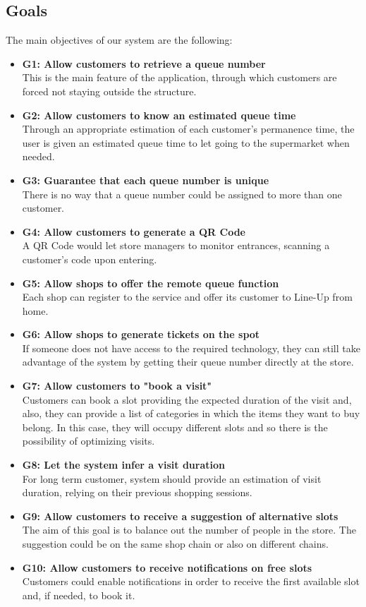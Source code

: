 \documentclass[12pt]{article}
\begin{document}
\subsection{Goals}
The main objectives of our system are the following:
\begin{itemize}
    \item {\textbf{G1: Allow customers to retrieve a queue number}\\This is the main feature of the application, through which customers are forced not staying outside the structure.}
    \item {\textbf{G2: Allow customers to know an estimated queue time}\\Through an appropriate estimation of each customer's permanence time, the user is given an estimated queue time to let going to the supermarket when needed.}
    \item {\textbf{G3: Guarantee that each queue number is unique}\\There is no way that a queue number could be assigned to more than one customer.}
    \item {\textbf{G4: Allow customers to generate a QR Code}\\A QR Code would let store managers to monitor entrances, scanning a customer's code upon entering.}
    \item {\textbf{G5: Allow shops to offer the remote queue function}\\Each shop can register to the service and offer its customer to Line-Up from home.}
    \item {\textbf{G6: Allow shops to generate tickets on the spot}\\If someone does not have access to the required technology, they can still take advantage of the system by getting their queue number directly at the store.}
    \item {\textbf{G7: Allow customers to "book a visit"}\\Customers can book a slot providing the expected duration of the visit and, also, they can provide a list of categories in which the items they want to buy belong. In this case, they will occupy different slots and so there is the possibility of optimizing visits.}
    \item {\textbf{G8: Let the system infer a visit duration}\\For long term customer, system should provide an estimation of visit duration, relying on their previous shopping sessions.}
    \item {\textbf{G9: Allow customers to receive a suggestion of alternative slots}\\The aim of this goal is to balance out the number of people in the store. The suggestion could be on the same shop chain or also on different chains.}
    \item {\textbf{G10: Allow customers to receive notifications on free slots}\\Customers could enable notifications in order to receive the first available slot and, if needed, to book it.}
\end{itemize}
\end{document}
